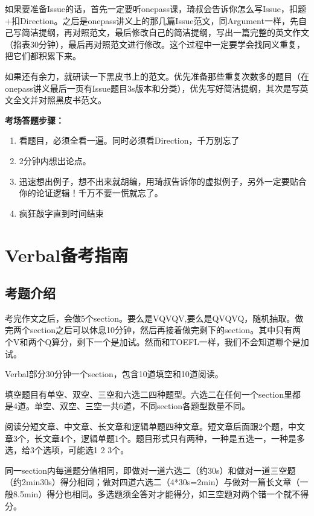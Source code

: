 \documentclass[cn,plain]{./src/qyxfbook}
\begin{document}
			
			如果要准备Issue的话，首先一定要听onepass课，琦叔会告诉你怎么写Issue，扣题+扣Direction。之后是onepass讲义上的那几篇Issue范文，同Argument一样，先自己写简洁提纲，再对照范文，最后修改自己的简洁提纲，写出一篇完整的英文作文（掐表30分钟），最后再对照范文进行修改。这个过程中一定要学会找同义重复，把它们都积累下来。\par
			
			如果还有余力，就研读一下黑皮书上的范文。优先准备那些重复次数多的题目（在onepass讲义最后一页有Issue题目3s版本和分类），优先写好简洁提纲，其次是写英文全文并对照黑皮书范文。\par
			
		\textbf{考场答题步骤：}
		\begin{enumerate}
			\item 看题目，必须全看一遍。同时必须看Direction，千万别忘了
			\item 2分钟内想出论点。
			\item 迅速想出例子，想不出来就胡编，用琦叔告诉你的虚拟例子，另外一定要贴合你的论证逻辑！千万不要一慌就忘了。
			\item 疯狂敲字直到时间结束
		\end{enumerate}

	
	\chapter{Verbal备考指南}
		
		\section{考题介绍}
			考完作文之后，会做5个section。要么是VQVQV,要么是QVQVQ，随机抽取。做完两个section之后可以休息10分钟，然后再接着做完剩下的section。其中只有两个V和两个Q算分，剩下一个是加试。然而和TOEFL一样，我们不会知道哪个是加试。

			
			Verbal部分30分钟一个section，包含10道填空和10道阅读。\par
			填空题目有单空、双空、三空和六选二四种题型。六选二在任何一个section里都是4道。单空、双空、三空一共6道，不同section各题型数量不同。\par
			阅读分短文章、中文章、长文章和逻辑单题四种文章。短文章后面跟2个题，中文章3个，长文章4个，逻辑单题1个。题目形式只有两种，一种是五选一，一种是多选，给3个选项，可能选1 2 3个。\par
			同一section内每道题分值相同，即做对一道六选二（约30s）和做对一道三空题（约2min30s）得分相同；做对四道六选二（4*30s=2min）与做对一篇长文章（一般8.5min）得分也相同。多选题须全答对才能得分，如三空题对两个错一个就不得分。
\end{document}
